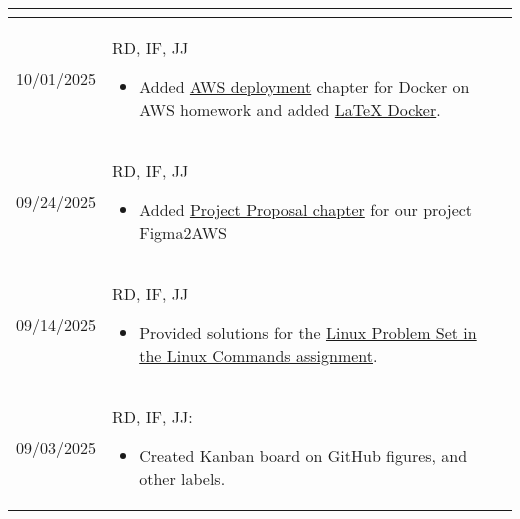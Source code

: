 \begin{longtable}{|l||p{13.5cm}|}
\begin{itemize}[topsep=0pt,itemsep=0pt,parsep=0pt,partopsep=0pt,leftmargin=12pt]
    \end{itemize}
\\ \hline

10/01/2025 & RD, IF, JJ
\begin{itemize}[topsep=0pt,itemsep=0pt,parsep=0pt,partopsep=0pt,leftmargin=12pt]
    \item Added \hyperref[Chapter::AWSDeployment]{AWS deployment} chapter for Docker on AWS homework and added \hyperref[Chapter::LaTeXDocker]{LaTeX Docker}.
\end{itemize}
\\ \hline

09/24/2025 & RD, IF, JJ
\begin{itemize}[topsep=0pt,itemsep=0pt,parsep=0pt,partopsep=0pt,leftmargin=12pt]
    \item Added \hyperref[chap:pproposal]{Project Proposal chapter} for our project Figma2AWS
\end{itemize}
\\ \hline

09/14/2025 & RD, IF, JJ
\begin{itemize}[topsep=0pt,itemsep=0pt,parsep=0pt,partopsep=0pt,leftmargin=12pt]
    \item Provided solutions for the \hyperref[chap:linux]{Linux Problem Set in the Linux Commands assignment}.
\end{itemize}
\\ \hline

09/03/2025 & RD, IF, JJ:
\begin{itemize}[topsep=0pt,itemsep=0pt,parsep=0pt,partopsep=0pt,leftmargin=12pt]
\item Created Kanban board on GitHub 
figures, and other labels.
\end{itemize} 
\\ \hline





\end{longtable}


